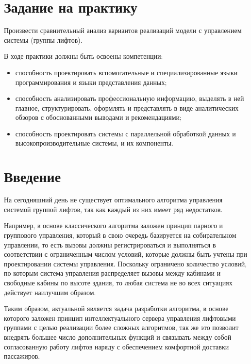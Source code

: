 \section{Задание на практику}
	Произвести сравнительный анализ вариантов реализаций модели с управлением системы (группы лифтов).

	В ходе практики должны быть освоены компетенции:
		\begin{itemize}
			\item способность проектировать вспомогательные и специализированные языки программирования и языки представления данных;
			\item способность анализировать профессиональную информацию, выделять в ней главное, структурировать, оформлять и представлять в виде аналитических обзоров с обоснованными выводами и рекомендациями;
			\item способность проектировать системы с параллельной обработкой данных и высокопроизводительные системы, и их компоненты.
		\end{itemize}

\newpage
\section{Введение}
	На сегодняшний день не существует оптимального алгоритма управления системой группой лифтов, так как каждый из них имеет ряд недостатков.

	Например, в основе классического алгоритма заложен принцип парного и группового управления, который в свою очередь базируется на собирательном управлении,
		то есть вызовы должны регистрироваться и выполняться в соответствии с ограниченным числом условий, которые должны быть учтены при проектировании
		системы управления. Поскольку ограничено количество условий, по которым система управления распределяет вызовы между кабинами
		и свободные кабины по высоте здания, то любая система не во всех ситуациях действует наилучшим образом.

	Таким образом, актуальной является задача разработки алгоритма, в основе которого заложен принцип
	интеллектуального сервера управления лифтовыми группами с целью реализации более сложных алгоритмов, так же это позволит внедрять большее число
		дополнительных функций и связывать между собой согласованную работу лифтов наряду с обеспечением комфортной доставки пассажиров.
